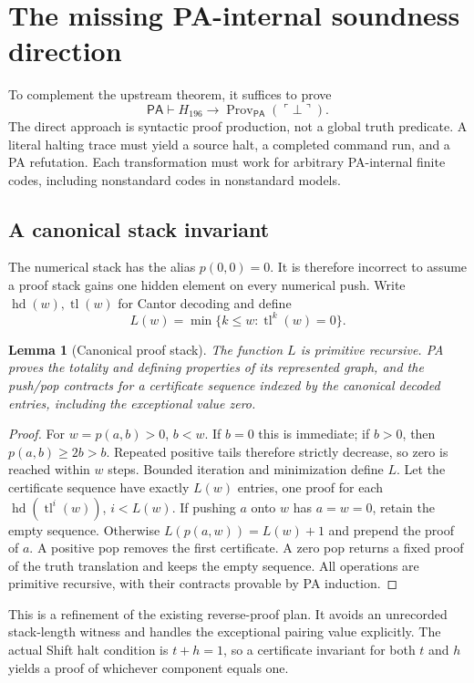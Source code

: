 \documentclass[11pt,letterpaper]{article}
\newtheorem{lemma}[theorem]{Lemma}
\newcommand{\PA}{\mathsf{PA}}
\newcommand{\Prov}{\operatorname{Prov}}
\begin{document}
\section{The missing PA-internal soundness direction}

To complement the upstream theorem, it suffices to prove
\[
 \PA\vdash H_{196}\to\Prov_{\PA}(\ulcorner\bot\urcorner).
\]
The direct approach is syntactic proof production, not a global truth
predicate. A literal halting trace must yield a source halt, a completed
command run, and a PA refutation. Each transformation must work for
arbitrary PA-internal finite codes, including nonstandard codes in
nonstandard models.

\subsection{A canonical stack invariant}

The numerical stack has the alias $p(0,0)=0$. It is therefore incorrect to
assume a proof stack gains one hidden element on every numerical push.
Write $\operatorname{hd}(w),\operatorname{tl}(w)$ for Cantor decoding and
define
\[
 L(w)=\min\{k\le w:\operatorname{tl}^{k}(w)=0\}.
\]

\begin{lemma}[Canonical proof stack]
The function $L$ is primitive recursive. PA proves the totality and
defining properties of its represented graph, and the push/pop contracts
for a certificate sequence indexed by the canonical decoded entries,
including the exceptional value zero.
\end{lemma}
\begin{proof}
For $w=p(a,b)>0$, $b<w$. If $b=0$ this is immediate; if $b>0$, then
$p(a,b)\ge2b>b$. Repeated positive tails therefore strictly decrease, so
zero is reached within $w$ steps. Bounded iteration and minimization define
$L$. Let the certificate sequence have exactly $L(w)$ entries, one proof
for each $\operatorname{hd}(\operatorname{tl}^{i}(w))$, $i<L(w)$.
If pushing $a$ onto $w$ has $a=w=0$, retain the empty sequence. Otherwise
$L(p(a,w))=L(w)+1$ and prepend the proof of $a$. A positive pop removes
the first certificate. A zero pop returns a fixed proof of the truth
translation and keeps the empty sequence. All operations are primitive
recursive, with their contracts provable by PA induction.
\end{proof}

This is a refinement of the existing reverse-proof plan. It avoids an
unrecorded stack-length witness and handles the exceptional pairing value
explicitly. The actual Shift halt condition is $t+h=1$, so a certificate
invariant for both $t$ and $h$ yields a proof of whichever component equals
one.
\end{document}
